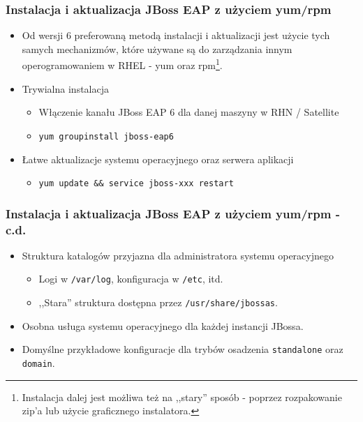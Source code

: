 \documentclass[dvipsnames,table]{beamer}
\begin{document}
\begin{frame}
\frametitle{Instalacja i aktualizacja JBoss EAP z użyciem yum/rpm}
\begin{itemize}
	\item Od wersji 6 preferowaną metodą instalacji i aktualizacji jest użycie tych samych mechanizmów, które używane są do zarządzania innym operogramowaniem w RHEL - yum oraz rpm\footnote{Instalacja dalej jest możliwa też na ,,stary'' sposób - poprzez rozpakowanie zip'a lub użycie graficznego instalatora.}.
	\item Trywialna instalacja
	\begin{itemize}
		\item Włączenie kanału JBoss EAP 6 dla danej maszyny w RHN / Satellite
		\item {\tt yum groupinstall jboss-eap6}
	\end{itemize}
	\item Łatwe aktualizacje systemu operacyjnego oraz serwera aplikacji
	\begin{itemize}
		\item {\tt yum update \&\& service jboss-xxx restart}
	\end{itemize}

\end{itemize}
\end{frame}

\begin{frame}
\frametitle{Instalacja i aktualizacja JBoss EAP z użyciem yum/rpm - c.d.}
\begin{itemize}
	\item Struktura katalogów przyjazna dla administratora systemu operacyjnego
	\begin{itemize}
		\item Logi w {\tt /var/log}, konfiguracja w {\tt /etc}, itd.
		\item ,,Stara'' struktura dostępna przez {\tt /usr/share/jbossas}.
	\end{itemize}
	\item Osobna usługa systemu operacyjnego dla każdej instancji JBossa.
	\item Domyślne przykładowe konfiguracje dla trybów osadzenia {\tt standalone} oraz {\tt domain}.

\end{itemize}
\end{frame}
\end{document}
